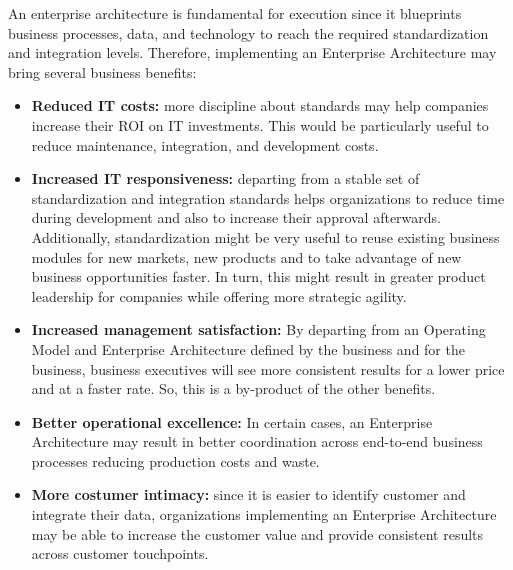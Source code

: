 %
%
An enterprise architecture is fundamental for execution since it blueprints business processes, data, and
technology to reach the required standardization and integration levels.
Therefore, implementing an Enterprise Architecture may bring several business benefits:

\begin{itemize}
    \item \textbf{Reduced IT costs:} more discipline about standards may help companies increase their
          ROI on IT investments.
          This would be particularly useful to reduce maintenance, integration, and development costs.
    \item \textbf{Increased IT responsiveness:} departing from a stable set of standardization and integration standards
          helps organizations to reduce time during development and also to increase their approval afterwards.
          Additionally, standardization might be very useful to reuse existing business modules for new markets,
          new products and to take advantage of new business opportunities faster.
          In turn, this might result in greater product leadership for companies while offering more strategic agility.
    \item \textbf{Increased management satisfaction:} By departing from an Operating Model
          and Enterprise Architecture
          defined by the business and for the business, business executives will see more consistent results
          for a lower price and at a faster rate.
          So, this is a by-product of the other benefits.
    \item \textbf{Better operational excellence:} In certain cases, an Enterprise Architecture may result in better
          coordination across end-to-end business processes reducing production costs and waste.
    \item \textbf{More costumer intimacy:} since it is easier to identify customer and integrate their data,
          organizations implementing an Enterprise Architecture may be able to increase the customer value
          and provide consistent results across customer touchpoints.
\end{itemize}

